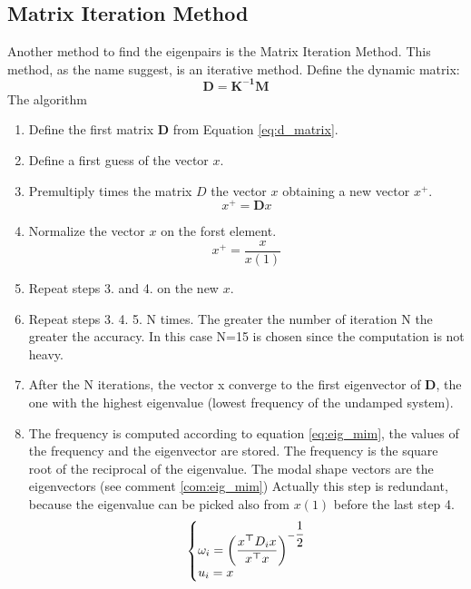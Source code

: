 \documentclass[twosided,a4paper]{article}           %
\makeatletter
\newcounter{comment}[section]
\newcommand{\tr}{^{{\bm \top}}}
\newenvironment{sistema}%
{\left\lbrace\begin{array}{@{}l@{}}}%
	{\end{array}\right.}
\makeatother
\begin{document}
\subsection{Matrix Iteration Method}
	Another method to find the eigenpairs is the Matrix Iteration Method. This method, as the name suggest, is an iterative method.
	Define the dynamic matrix:
	\begin{equation}
	    \label{eq:d_matrix}
		\bm{D} = \bm{K^{-1}}\bm{M}
	\end{equation}
	The algorithm
	\begin{enumerate}
		\item Define the first matrix $\bm{D}$ from Equation \eqref{eq:d_matrix}.
		\item Define a first guess of the vector $x$.
		\item Premultiply times the matrix $D$ the vector $x$ obtaining a new vector $x^+$.
		\begin{equation}
			x^+ = \bm{D}x
		\end{equation}
		\item Normalize the vector $x$ on the forst element.
		\begin{equation}
			x^+ = \dfrac{x}{x(1)}
		\end{equation}
		\item Repeat steps 3. and 4. on the new $x$.
		\item Repeat steps 3. 4. 5. N times. The greater the number of iteration N the greater the accuracy. In this case N=15 is chosen since the computation is not heavy.
		\item After the N iterations, the vector x converge to the first eigenvector of $\bm{D}$, the one with the highest eigenvalue (lowest frequency of the undamped system).
		\item The frequency is computed according to equation \eqref{eq:eig_mim}, the values of the frequency and the eigenvector are stored. The frequency is the square root of the reciprocal of the eigenvalue. The modal shape vectors are the eigenvectors (see comment \ref{com:eig_mim}) Actually this step is redundant, because the eigenvalue can be picked also from $x(1)$ before the last step 4.
		\begin{equation}
		\label{eq:eig_mim}
		\begin{sistema}
			\omega_i = \left (\dfrac{x\tr D_i x}{x\tr x}\right )^{-\dfrac{1}{2}}\\
			u_i = x
		\end{sistema}
		\end{equation}

\end{enumerate}
\end{document}
